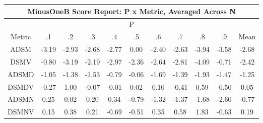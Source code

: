 \documentclass[11pt,a4paper]{report}
\begin{document}
\begin{longtable}{ | c || c | c | c | c | c | c | c | c | c || c |}
\hline
\multicolumn{11}{|c|}{ MinusOneB Score Report: P x Metric, Averaged Across N } \\
\hline
\multicolumn{11}{|c|}{ P } \\
\hline
Metric & .1 & .2 & .3 & .4 & .5 & .6 & .7 & .8 & .9 & Mean\\
\hline
\hline
\endhead
ADSM &  \cellcolor[HTML]{FFAFAF} -3.19 &  \cellcolor[HTML]{FFB7B7} -2.93 &  \cellcolor[HTML]{FFBFBF} -2.68 &  \cellcolor[HTML]{FFB7B7} -2.77 &  \cellcolor[HTML]{FFFFFF} 0.00 &  \cellcolor[HTML]{FFBFBF} -2.40 &  \cellcolor[HTML]{FFBFBF} -2.63 &  \cellcolor[HTML]{FF9F9F} -3.94 &  \cellcolor[HTML]{FFA7A7} -3.58 &  \cellcolor[HTML]{FFBFBF} -2.68 \\
DSMV &  \cellcolor[HTML]{FFE7E7} -0.80 &  \cellcolor[HTML]{FFAFAF} -3.19 &  \cellcolor[HTML]{FFC7C7} -2.19 &  \cellcolor[HTML]{FFB7B7} -2.97 &  \cellcolor[HTML]{FFC7C7} -2.36 &  \cellcolor[HTML]{FFBFBF} -2.64 &  \cellcolor[HTML]{FFB7B7} -2.81 &  \cellcolor[HTML]{FF9797} -4.09 &  \cellcolor[HTML]{FFEFEF} -0.71 &  \cellcolor[HTML]{FFBFBF} -2.42 \\
ADSMD &  \cellcolor[HTML]{FFE7E7} -1.05 &  \cellcolor[HTML]{FFDFDF} -1.38 &  \cellcolor[HTML]{FFD7D7} -1.53 &  \cellcolor[HTML]{FFE7E7} -0.79 &  \cellcolor[HTML]{FFFFFF} -0.06 &  \cellcolor[HTML]{FFD7D7} -1.69 &  \cellcolor[HTML]{FFDFDF} -1.39 &  \cellcolor[HTML]{FFCFCF} -1.93 &  \cellcolor[HTML]{FFD7D7} -1.47 &  \cellcolor[HTML]{FFDFDF} -1.25 \\
DSMDV &  \cellcolor[HTML]{FFF7F7} -0.27 &  \cellcolor[HTML]{E7E7FF} 1.00 &  \cellcolor[HTML]{FFFFFF} -0.07 &  \cellcolor[HTML]{FFFFFF} -0.01 &  \cellcolor[HTML]{FFFFFF} 0.02 &  \cellcolor[HTML]{FFFFFF} 0.10 &  \cellcolor[HTML]{FFF7F7} -0.41 &  \cellcolor[HTML]{EFEFFF} 0.59 &  \cellcolor[HTML]{FFEFEF} -0.50 &  \cellcolor[HTML]{FFFFFF} 0.05 \\
ADSMN &  \cellcolor[HTML]{F7F7FF} 0.25 &  \cellcolor[HTML]{FFFFFF} 0.02 &  \cellcolor[HTML]{F7F7FF} 0.20 &  \cellcolor[HTML]{F7F7FF} 0.34 &  \cellcolor[HTML]{FFEFEF} -0.79 &  \cellcolor[HTML]{FFDFDF} -1.32 &  \cellcolor[HTML]{FFDFDF} -1.37 &  \cellcolor[HTML]{FFD7D7} -1.68 &  \cellcolor[HTML]{FFBFBF} -2.60 &  \cellcolor[HTML]{FFEFEF} -0.77 \\
DSMNV &  \cellcolor[HTML]{FFFFFF} 0.15 &  \cellcolor[HTML]{F7F7FF} 0.38 &  \cellcolor[HTML]{F7F7FF} 0.21 &  \cellcolor[HTML]{FFEFEF} -0.69 &  \cellcolor[HTML]{FFEFEF} -0.51 &  \cellcolor[HTML]{F7F7FF} 0.35 &  \cellcolor[HTML]{EFEFFF} 0.58 &  \cellcolor[HTML]{CFCFFF} 1.83 &  \cellcolor[HTML]{FFEFEF} -0.63 &  \cellcolor[HTML]{F7F7FF} 0.19 \\

\end{longtable}
\end{document}
